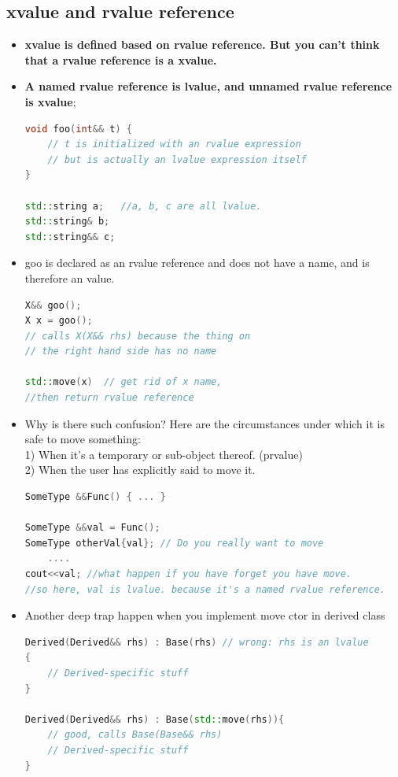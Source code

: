 \documentclass[a4paper,11pt,twoside]{book}
\begin{document}
\subsection{xvalue and rvalue reference}

\begin{itemize}
	\item \textbf{xvalue is defined based on rvalue reference. But you can't think that a rvalue reference is a xvalue. }
	
	\item \textbf{A named rvalue reference is lvalue, and unnamed rvalue reference is xvalue};
	
\begin{lstlisting}[frame=single, language=c++,mathescape=true]
void foo(int&& t) {
	// t is initialized with an rvalue expression
	// but is actually an lvalue expression itself
}
	
std::string a;   //a, b, c are all lvalue.
std::string& b;
std::string&& c;
	\end{lstlisting}
	
	
\item goo is declared as an rvalue reference and does not have a name, and is therefore an value.
\begin{lstlisting}[frame=single, language=c++,mathescape=true]
X&& goo();
X x = goo();
// calls X(X&& rhs) because the thing on
// the right hand side has no name
	
std::move(x)  // get rid of x name,
//then return rvalue reference
\end{lstlisting}
	
	\item Why is there such confusion? Here are the circumstances under which it is safe to move something:\\
	1) When it's a temporary or sub-object thereof. (prvalue) \\
	2) When the user has explicitly said to move it.
\begin{lstlisting}[frame=single, language=c++]
SomeType &&Func() { ... }
	
SomeType &&val = Func();
SomeType otherVal{val}; // Do you really want to move 
	....
cout<<val; //what happen if you have forget you have move.
//so here, val is lvalue. because it's a named rvalue reference.
\end{lstlisting}
	
\item Another deep trap happen when you implement move ctor in derived class
\begin{lstlisting}[frame=single, language=c++]
Derived(Derived&& rhs) : Base(rhs) // wrong: rhs is an lvalue
{
	// Derived-specific stuff
}
	
Derived(Derived&& rhs) : Base(std::move(rhs)){
	// good, calls Base(Base&& rhs)
	// Derived-specific stuff
}
	\end{lstlisting}
	
\end{itemize}
\end{document}
